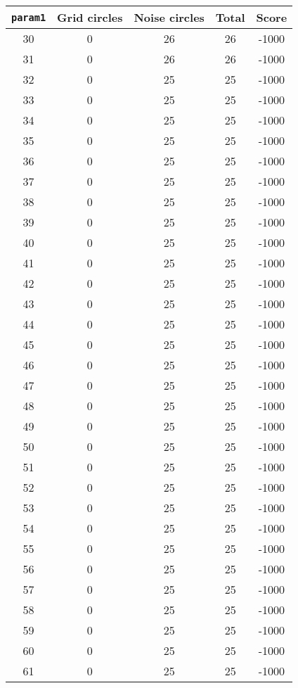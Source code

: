 \documentclass[letterpaper, 12pt]{article}
\begin{document}
\begin{longtable}{|c|c|c|c|c|}
\hline
\textbf{\texttt{param1}} & \textbf{Grid circles} & \textbf{Noise circles} & \textbf{Total} & \textbf{Score} \\
\hline
30 & 0 & 26 & 26 & -1000 \\
\hline
31 & 0 & 26 & 26 & -1000 \\
\hline
32 & 0 & 25 & 25 & -1000 \\
\hline
33 & 0 & 25 & 25 & -1000 \\
\hline
34 & 0 & 25 & 25 & -1000 \\
\hline
35 & 0 & 25 & 25 & -1000 \\
\hline
36 & 0 & 25 & 25 & -1000 \\
\hline
37 & 0 & 25 & 25 & -1000 \\
\hline
38 & 0 & 25 & 25 & -1000 \\
\hline
39 & 0 & 25 & 25 & -1000 \\
\hline
40 & 0 & 25 & 25 & -1000 \\
\hline
41 & 0 & 25 & 25 & -1000 \\
\hline
42 & 0 & 25 & 25 & -1000 \\
\hline
43 & 0 & 25 & 25 & -1000 \\
\hline
44 & 0 & 25 & 25 & -1000 \\
\hline
45 & 0 & 25 & 25 & -1000 \\
\hline
46 & 0 & 25 & 25 & -1000 \\
\hline
47 & 0 & 25 & 25 & -1000 \\
\hline
48 & 0 & 25 & 25 & -1000 \\
\hline
49 & 0 & 25 & 25 & -1000 \\
\hline
50 & 0 & 25 & 25 & -1000 \\
\hline
51 & 0 & 25 & 25 & -1000 \\
\hline
52 & 0 & 25 & 25 & -1000 \\
\hline
53 & 0 & 25 & 25 & -1000 \\
\hline
54 & 0 & 25 & 25 & -1000 \\
\hline
55 & 0 & 25 & 25 & -1000 \\
\hline
56 & 0 & 25 & 25 & -1000 \\
\hline
57 & 0 & 25 & 25 & -1000 \\
\hline
58 & 0 & 25 & 25 & -1000 \\
\hline
59 & 0 & 25 & 25 & -1000 \\
\hline
60 & 0 & 25 & 25 & -1000 \\
\hline
61 & 0 & 25 & 25 & -1000 \\

\end{longtable}
\end{document}

